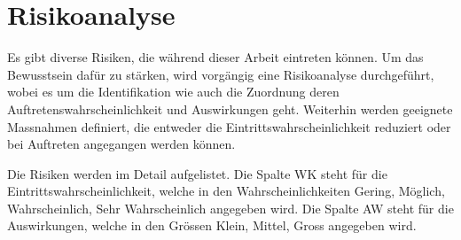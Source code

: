 \newpage
\section{Risikoanalyse}
Es gibt diverse Risiken, die während dieser Arbeit eintreten können. Um das Bewusstsein dafür zu stärken,
wird vorgängig eine Risikoanalyse durchgeführt, wobei es um die Identifikation wie auch die Zuordnung deren
Auftretenswahrscheinlichkeit und Auswirkungen geht. Weiterhin werden geeignete Massnahmen definiert, die entweder
die Eintrittswahrscheinlichkeit reduziert oder bei Auftreten angegangen werden können.

Die Risiken werden im Detail aufgelistet. Die Spalte \glqq WK\grqq{} steht für die Eintrittswahrscheinlichkeit, welche
in den Wahrscheinlichkeiten \glqq Gering\grqq, \glqq Möglich\grqq, \glqq Wahrscheinlich\grqq, \glqq Sehr Wahrscheinlich\grqq{}
angegeben wird. Die Spalte \glqq AW\grqq{} steht für die Auswirkungen, welche in den Grössen \glqq Klein\grqq, \glqq Mittel\grqq, \glqq Gross\grqq{}
angegeben wird.

